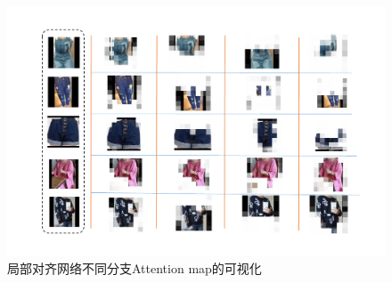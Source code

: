 \begin{figure}[h]
  \centering
  \includegraphics[width=1.0\linewidth]{Img/part-vis.pdf}
  \caption{局部对齐网络不同分支Attention map的可视化}
  \label{fig:part-vis}
\end{figure}
